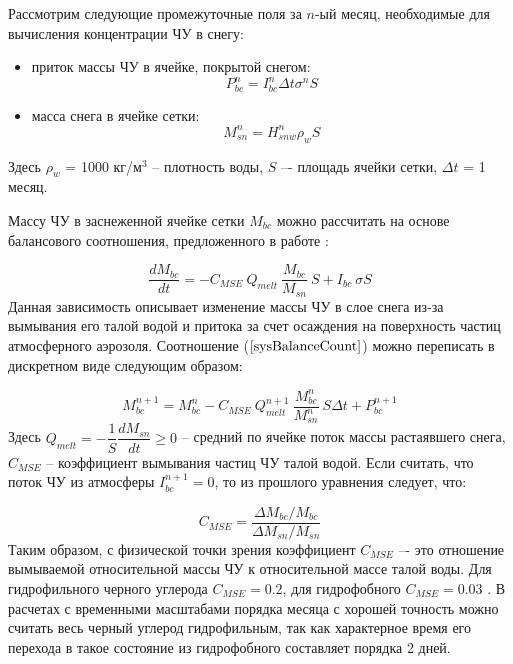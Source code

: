\documentclass[a4paper, fontsize=14pt]{scrartcl}
\begin{document}
Рассмотрим следующие промежуточные поля за $n$-ый месяц, необходимые для вычисления концентрации ЧУ в снегу: 
\begin{itemize}
    \item приток массы ЧУ в ячейке, покрытой снегом:
    \begin{equation}
        P_{bc}^n = I_{bc}^n \Delta t \sigma^n S   \label{sys}
    \end{equation}
    \item масса снега в ячейке сетки:
    \begin{equation}
        M_{sn}^n = H_{snw}^n \rho_w S   \label{sys}
    \end{equation}
\end{itemize} 
Здесь $\rho_w$ = 1000 кг/м$^3$ -- плотность воды, $S$ –- площадь ячейки сетки, $\Delta t$ = 1 месяц.
    
Массу ЧУ в заснеженной ячейке сетки $M_{bc}$ можно рассчитать на основе балансового соотношения, предложенного в работе \cite{Flanner2007}:

\begin{equation}
    \dfrac{d M_{bc}}{d t} = - C_{MSE} ~ Q_{melt} ~ \dfrac{M_{bc}}{M_{sn}} ~ S + I_{bc} ~ \sigma S     \label{sysBalanceCount}
\end{equation}
Данная зависимость описывает изменение массы ЧУ в слое снега из-за вымывания его талой водой и притока за счет осаждения на поверхность частиц атмосферного аэрозоля. Соотношение ($\ref{sysBalanceCount}$) можно переписать в дискретном виде следующим образом:

\begin{equation}
   M_{bc}^{n+1} = M_{bc}^n - C_{MSE} ~ Q_{melt}^{n+1} ~ \dfrac{M_{bc}^n}{M_{sn}^n} ~ S \Delta t + P_{bc}^{n+1}     \label{sysBalance}
\end{equation}
Здесь $Q_{melt} = - \dfrac{1}{S} \dfrac{dM_{sn}}{dt} \geq 0$ --  средний по ячейке поток массы растаявшего снега, $C_{MSE}$ -- коэффициент вымывания частиц ЧУ талой водой. Если считать, что поток ЧУ из атмосферы $I_{bc}^{n + 1} = 0$, то из прошлого уравнения следует, что:

\begin{equation}
   C_{MSE} = \dfrac{\Delta M_{bc} / M_{bc}}{\Delta M_{sn} / M_{sn}}     \label{sys}
\end{equation}
Таким образом, с физической точки зрения коэффициент $C_{MSE}$ –- это отношение вымываемой относительной массы ЧУ к относительной
массе талой воды. Для гидрофильного черного углерода $C_{MSE} = 0.2$, для гидрофобного $C_{MSE} = 0.03$ \cite{Flanner2007, Conway1996}. В расчетах с временными масштабами порядка месяца с хорошей точность можно считать весь черный углерод гидрофильным, так как характерное время его перехода в такое состояние из гидрофобного составляет порядка 2 дней.
\end{document}
